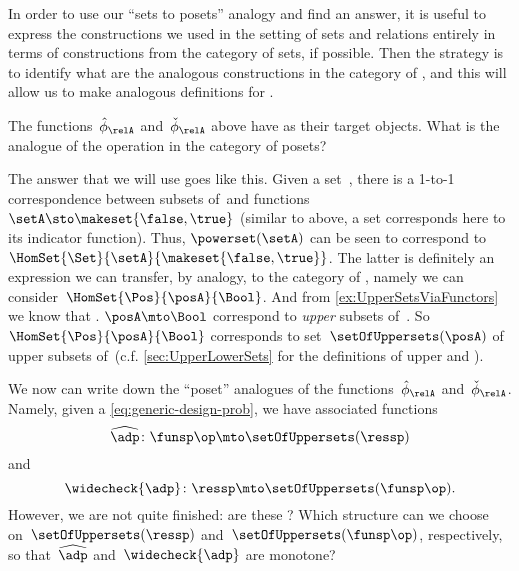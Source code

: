 In order to use our ``sets to posets'' analogy and find an answer, it is useful to express the constructions we used in the setting of sets and relations entirely in terms of constructions from the category of sets, if possible.
Then the strategy is to identify what are the analogous constructions in the category of , and this will allow us to make analogous definitions for .

The functions~$\hat \phi_{\relA}$ and~$\check \phi_{\relA}$ above have  as their target objects.
What is the analogue of the  operation in the category of posets?

The answer that we will use goes like this.
Given a set~\setA, there is a 1-to-1 correspondence between subsets of~\setA and functions~$\setA \sto \makeset{ \false, \true }$ (similar to above, a set corresponds here to its indicator function).
Thus, $\powerset (\setA)$ can be seen to correspond to~$\HomSet{\Set}{\setA}{\makeset{ \false, \true}}$.
The latter is definitely an expression we can transfer, by analogy, to the category of , namely we can consider~$\HomSet{\Pos}{\posA}{\Bool}$.
And from \cref{ex:UpperSetsViaFunctors} we know that .
$\posA \mto \Bool$ correspond to \emph{upper} subsets of~\posA.
So~$\HomSet{\Pos}{\posA}{\Bool}$ corresponds to set~$\setOfUppersets (\posA)$ of upper subsets of~\posA (c.f.
\cref{sec:UpperLowerSets} for the definitions of upper and ).

We now can write down the ``poset'' analogues of the functions~$\hat \phi_{\relA}$ and~$\check \phi_{\relA}$.
Namely, given a  \cref{eq:generic-design-prob}, we have associated functions
\begin{equation}
    \label{eq:dp-left-curry}
    \widehat{\adp} \colon \funsp\op \mto \setOfUppersets (\ressp)
\end{equation}
and
\begin{equation}
    \label{eq:dp-right-curry}
    \widecheck{\adp} \colon \ressp \mto \setOfUppersets (\funsp\op).
\end{equation}
However, we are not quite finished: are these  ?
Which  structure can we choose on~$\setOfUppersets (\ressp)$ and~$\setOfUppersets (\funsp\op)$, respectively, so that~$\widehat{\adp}$ and~$\widecheck{\adp}$ are monotone?

